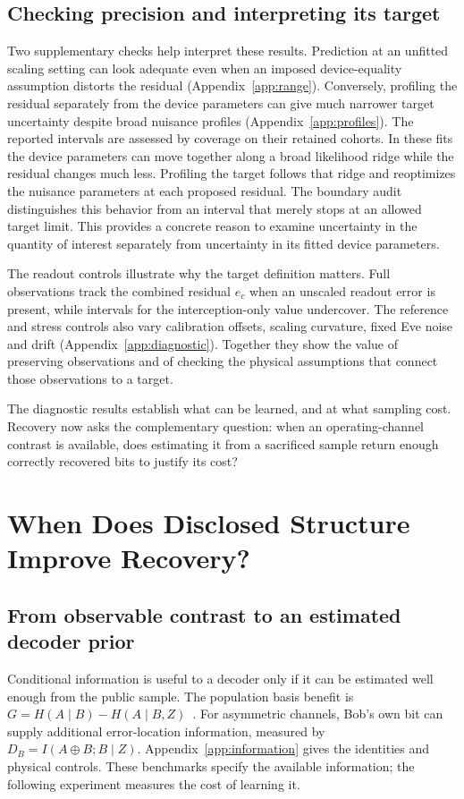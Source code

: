 \documentclass[manuscript,screen,review,anonymous]{acmart}
\begin{document}
\subsection{Checking precision and interpreting its target}
Two supplementary checks help interpret these results. Prediction at an
unfitted scaling setting can look adequate even when an imposed device-equality
assumption distorts the residual (Appendix~\ref{app:range}).
Conversely, profiling the residual separately from the device parameters
can give much narrower target uncertainty despite broad nuisance profiles
(Appendix~\ref{app:profiles}). The reported intervals are assessed by coverage
on their retained cohorts. In these fits the device parameters can move together
along a broad likelihood ridge while the residual changes much less. Profiling
the target follows that ridge and reoptimizes the nuisance parameters at each
proposed residual. The boundary audit distinguishes this behavior from an
interval that merely stops at an allowed target limit. This provides a concrete
reason to examine uncertainty in the quantity of interest separately from
uncertainty in its fitted device parameters.

The readout controls illustrate why the target definition matters.
Full observations track the combined residual $e_c$ when an unscaled
readout error is present, while intervals for the interception-only value
undercover. The reference and stress controls also vary calibration offsets,
scaling curvature, fixed Eve noise and drift (Appendix~\ref{app:diagnostic}).
Together they show the value of preserving observations and of checking the
physical assumptions that connect those observations to a target.

The diagnostic results establish what can be learned, and at what sampling
cost. Recovery now asks the complementary question: when an operating-channel
contrast is available, does estimating it from a sacrificed sample return
enough correctly recovered bits to justify its cost?

\section{When Does Disclosed Structure Improve Recovery?}
\label{sec:results}
\subsection{From observable contrast to an estimated decoder prior}
Conditional information is useful to a decoder only if it can be estimated
well enough from the public sample. The population basis benefit is
$G=H(A\mid B)-H(A\mid B,Z)$~\cite{slepian1973,elkouss2011}.
For asymmetric channels, Bob's own bit can supply additional error-location
information, measured by $D_B=I(A\oplus B;B\mid Z)$.
Appendix~\ref{app:information} gives the identities and physical controls.
These benchmarks specify the available information; the following experiment
measures the cost of learning it.
\end{document}
